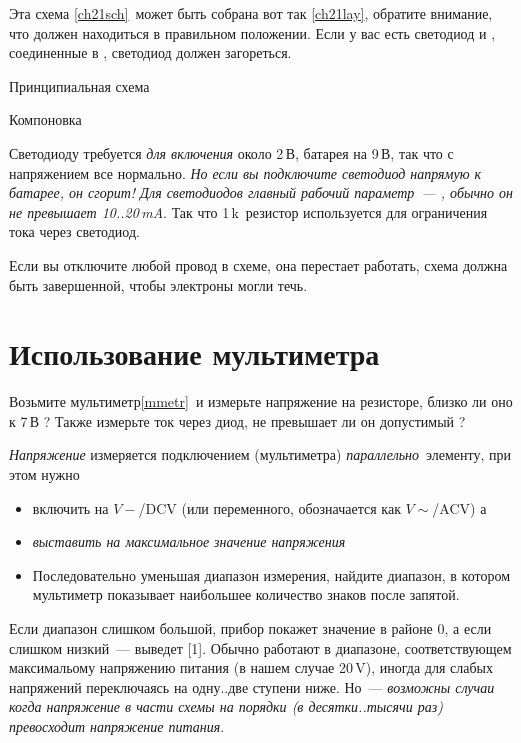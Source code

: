 \bigskip

Эта схема \ref{ch21sch}\ может быть собрана вот так \ref{ch21lay}, обратите
внимание, что  должен находиться в правильном положении. Если у
вас есть светодиод и , соединенные в ,
светодиод должен загореться.

\bigskip
Принципиальная схема \label{ch21sch}

\bigskip
Компоновка \label{ch21lay}

\bigskip
Светодиоду требуется \emph{для включения} около 2\,В, батарея на
9\,В, так что с напряжением все нормально.
\emph{Но если вы подключите светодиод напрямую к батарее, 
он сгорит! Для светодиодов главный рабочий параметр\ --- , обычно он не превышает 10..20\,mA}. Так что 1\,k\ резистор
используется для ограничения тока через светодиод.

\bigskip
Если вы отключите любой провод в схеме, она перестает работать, схема должна
быть завершенной, чтобы электроны могли течь.

\section{Использование мультиметра}

Возьмите мультиметр\ref{mmetr}\ и измерьте напряжение на резисторе, близко ли
оно к 7\,В ? Также измерьте ток через диод, не превышает ли он допустимый ?

\begin{framed}
\emph{Напряжение} измеряется  подключением
 (мультиметра) \emph{параллельно}\ элементу, при этом нужно
\begin{itemize}
\item
{} включить на
 $V-$/DCV (или переменного,
обозначается как $V\sim$/ACV) а
  \item {} \emph{выставить на максимальное значение напряжения}
\item 
Последовательно уменьшая диапазон измерения, найдите диапазон, в котором
мультиметр показывает наибольшее количество знаков после запятой. 
\end{itemize}
\end{framed}

Если диапазон
слишком большой, прибор покажет значение в районе 0, а если слишком низкий\ ---
выведет [1]. Обычно работают в диапазоне, соответствующем максимальому
напряжению питания (в нашем случае 20\,V), иногда для
слабых напряжений переключаясь на одну..две ступени ниже. Но\ ---
\emph{возможны случаи когда напряжение в части схемы на порядки (в десятки..тысячи
раз) превосходит напряжение питания}.


